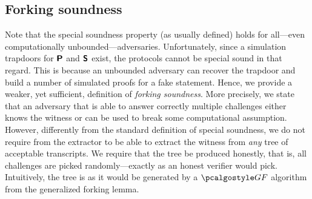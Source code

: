 \documentclass[runningheads,11pt]{llncs}
\begin{document}
\subsection{Forking soundness}
Note that the special soundness property (as usually defined) holds for
all---even computationally unbounded---adversaries. Unfortunately, since a
simulation trapdoors for $\bm{\mathsf{P}}$ and $\bm{\mathsf{S}}$ exist, the protocols
cannot be special sound in that regard. This is because an unbounded adversary
can recover the trapdoor and build a number of simulated proofs for a fake
statement. Hence, we provide a weaker, yet sufficient, definition of
\emph{forking soundness}. More precisely, we state that an
adversary that is able to answer correctly multiple challenges either knows the
witness or can be used to break some computational assumption.
However, differently from the standard definition of special soundness, we do
not require from the extractor to be able to extract the witness from \emph{any}
tree of acceptable transcripts. We require that the tree be produced honestly,
that is, all challenges are picked randomly---exactly as an honest verifier would pick.
Intuitively, the tree is as it would be generated by a $\genforking$
algorithm from the generalized forking lemma.

\end{document}
